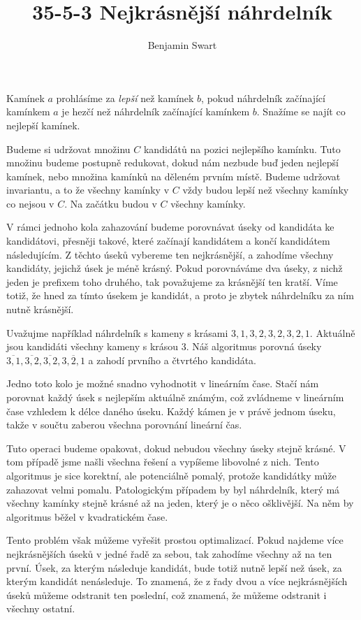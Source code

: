\documentclass{article}
\title{35-5-3 Nejkrásnější náhrdelník}
\author{Benjamin Swart}
\begin{document}
\maketitle

Kamínek $a$ prohlásíme za \textit{lepší} než kamínek $b$, pokud náhrdelník začínající kamínkem $a$ je hezčí než náhrdelník začínající kamínkem $b$. Snažíme se najít co nejlepší kamínek.

Budeme si udržovat množinu $C$ kandidátů na pozici nejlepšího kamínku. Tuto množinu budeme postupně redukovat, dokud nám nezbude buď jeden nejlepší kamínek, nebo množina kamínků na děleném prvním místě. Budeme udržovat invariantu, a to že všechny kamínky v $C$ vždy budou lepší než všechny kamínky co nejsou v $C$. Na začátku budou v $C$ všechny kamínky.

V rámci jednoho kola zahazování budeme porovnávat úseky od kandidáta ke kandidátovi, přesněji takové, které začínají kandidátem a končí kandidátem následujícím. Z těchto úseků vybereme ten nejkrásnější, a zahodíme všechny kandidáty, jejichž úsek je méně krásný. Pokud porovnáváme dva úseky, z nichž jeden je prefixem toho druhého, tak považujeme za krásnější ten kratší. Víme totiž, že hned za tímto úsekem je kandidát, a proto je zbytek náhrdelníku za ním nutně krásnější.

Uvažujme například náhrdelník s kameny s krásami $3,1,3,2,3,2,3,2,1$. Aktuálně jsou kandidáti všechny kameny s krásou $3$. Náš algoritmus porovná úseky $\overline{3,1},\overline{3,2},\overline{3,2},\overline{3,2,1}$ a zahodí prvního a čtvrtého kandidáta.

Jedno toto kolo je možné snadno vyhodnotit v lineárním čase. Stačí nám porovnat každý úsek s nejlepším aktuálně známým, což zvládneme v lineárním čase vzhledem k délce daného úseku. Každý kámen je v právě jednom úseku, takže v součtu zaberou všechna porovnání lineární čas.

Tuto operaci budeme opakovat, dokud nebudou všechny úseky stejně krásné. V tom případě jsme našli všechna řešení a vypíšeme libovolné z nich. Tento algoritmus je sice korektní, ale potenciálně pomalý, protože kandidátky může zahazovat velmi pomalu. Patologickým případem by byl náhrdelník, který má všechny kamínky stejně krásné až na jeden, který je o něco ošklivější. Na něm by algoritmus běžel v kvadratickém čase.

Tento problém však můžeme vyřešit prostou optimalizací. Pokud najdeme více nejkrásnějších úseků v jedné řadě za sebou, tak zahodíme všechny až na ten první. Úsek, za kterým následuje kandidát, bude totiž nutně lepší než úsek, za kterým kandidát nenásleduje. To znamená, že z řady dvou a více nejkrásnějších úseků můžeme odstranit ten poslední, což znamená, že můžeme odstranit i všechny ostatní.
\end{document}
